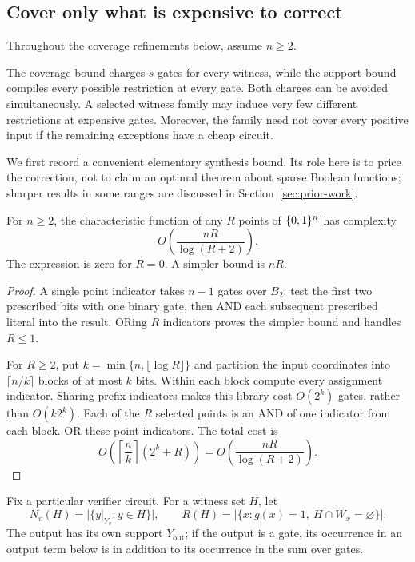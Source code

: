 \subsection{Cover only what is expensive to correct}\label{sec:coupled-coverage}

Throughout the coverage refinements below, assume $n\ge2$.

The coverage bound charges $s$ gates for every witness, while the support
bound compiles every possible restriction at every gate. Both charges can
be avoided simultaneously. A selected witness family may induce very few
different restrictions at expensive gates. Moreover, the family need not
cover every positive input if the remaining exceptions have a cheap circuit.

We first record a convenient elementary synthesis bound. Its role here is
to price the correction, not to claim an optimal theorem about sparse
Boolean functions; sharper results in some ranges are discussed in
Section~\ref{sec:prior-work}.

\begin{lemma}\label{lem:sparse}
For $n\ge2$, the characteristic function of any $R$ points of $\{0,1\}^n$
has complexity
\[
 O\!\left(\frac{nR}{\log(R+2)}\right).
\]
The expression is zero for $R=0$. A simpler bound is $nR$.
\end{lemma}
\begin{proof}
A single point indicator takes $n-1$ gates over $B_2$: test the first
two prescribed bits with one binary gate, then AND each subsequent
prescribed literal into the result. ORing $R$ indicators proves the
simpler bound and handles $R\le1$.

For $R\ge2$, put $k=\min\{n,\lfloor\log R\rfloor\}$ and partition
the input coordinates into $\lceil n/k\rceil$ blocks of at most $k$
bits. Within each block compute every assignment indicator. Sharing
prefix indicators makes this library cost $O(2^k)$ gates, rather than
$O(k2^k)$. Each of the $R$ selected points is an AND of one indicator
from each block. OR these point indicators. The total cost is
\[
 O\!\left(\left\lceil\frac nk\right\rceil(2^k+R)\right)
 =O\!\left(\frac{nR}{\log(R+2)}\right).
\]
\end{proof}

Fix a particular verifier circuit. For a witness set $H$, let
\[
 N_v(H)=\bigl|\{y|_{Y_v}:y\in H\}\bigr|,
 \qquad
 R(H)=\bigl|\{x:g(x)=1,\ H\cap W_x=\varnothing\}\bigr|.
\]
The output has its own support $Y_{\mathrm{out}}$; if the output is a
gate, its occurrence in an output term below is in addition to its
occurrence in the sum over gates.

